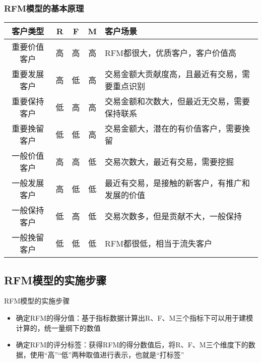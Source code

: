 \documentclass[t]{beamer}
\begin{document}
\begin{frame}
 \end{frame}   


 \begin{frame}
  \frametitle{RFM模型的基本原理}
\begin{center}
\normalsize
\begin{tabular}{ccccp{}}
\hline
  客户类型 &R& F & M& 客户场景\\
\hline
重要价值客户&高&高&高&RFM都很大，优质客户，客户价值高\\
重要发展客户&高&低&高&交易金额大贡献度高，且最近有交易，需要重点识别\\
重要保持客户&低&高&高&交易金额和次数大，但最近无交易，需要保持联系\\
重要挽留客户&低&低&高&交易金额大，潜在的有价值客户，需要挽留\\
一般价值客户&高&高&低&交易次数大，最近有交易，需要挖掘\\
一般发展客户&高&低&低&最近有交易，是接触的新客户，有推广和发展的价值\\
一般保持客户&低&高&低&交易次数多，但是贡献不大，一般保持\\
一般挽留客户&低&低&低&RFM都很低，相当于流失客户\\
\hline
\end{tabular}
\end{center}
  

\end{frame}




\subsection{RFM模型的实施步骤}
\begin{frame}{RFM模型的实施步骤}
\begin{itemize}
  \item 确定RFM的得分值：基于指标数据计算出R、F、M三个指标下可以用于建模计算的，{\color{red}统一量纲}下的数值
  \item 确定RFM的评分标签：获得RFM的得分数值后，将R、F、M三个维度下的数据，使用“高”“低”两种取值进行表示，也就是“打标签”
\end{itemize}
\end{frame}
\end{document}
